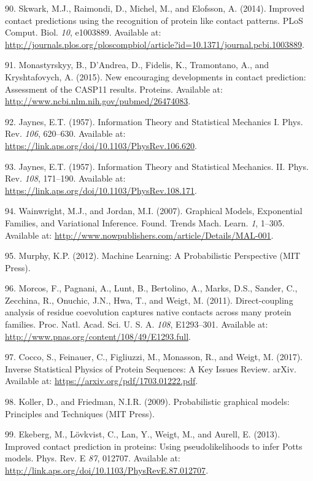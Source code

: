 \documentclass[11pt,a4paper,twoside]{book}
\theoremstyle{definition}
\theoremstyle{definition}
\theoremstyle{remark}
\begin{document}
\hypertarget{ref-Skwark2014a}{}
90. Skwark, M.J., Raimondi, D., Michel, M., and Elofsson, A. (2014).
Improved contact predictions using the recognition of protein like
contact patterns. PLoS Comput. Biol. \emph{10}, e1003889. Available at:
\url{http://journals.plos.org/ploscompbiol/article?id=10.1371/journal.pcbi.1003889}.

\hypertarget{ref-Monastyrskyy2015}{}
91. Monastyrskyy, B., D'Andrea, D., Fidelis, K., Tramontano, A., and
Kryshtafovych, A. (2015). New encouraging developments in contact
prediction: Assessment of the CASP11 results. Proteins. Available at:
\url{http://www.ncbi.nlm.nih.gov/pubmed/26474083}.

\hypertarget{ref-Jaynes1957a}{}
92. Jaynes, E.T. (1957). Information Theory and Statistical Mechanics I.
Phys. Rev. \emph{106}, 620--630. Available at:
\url{https://link.aps.org/doi/10.1103/PhysRev.106.620}.

\hypertarget{ref-Jaynes1957b}{}
93. Jaynes, E.T. (1957). Information Theory and Statistical Mechanics.
II. Phys. Rev. \emph{108}, 171--190. Available at:
\url{https://link.aps.org/doi/10.1103/PhysRev.108.171}.

\hypertarget{ref-Wainwright2007}{}
94. Wainwright, M.J., and Jordan, M.I. (2007). Graphical Models,
Exponential Families, and Variational Inference. Found. Trends Mach.
Learn. \emph{1}, 1--305. Available at:
\url{http://www.nowpublishers.com/article/Details/MAL-001}.

\hypertarget{ref-Murphy2012}{}
95. Murphy, K.P. (2012). Machine Learning: A Probabilistic Perspective
(MIT Press).

\hypertarget{ref-Morcos2011}{}
96. Morcos, F., Pagnani, A., Lunt, B., Bertolino, A., Marks, D.S.,
Sander, C., Zecchina, R., Onuchic, J.N., Hwa, T., and Weigt, M. (2011).
Direct-coupling analysis of residue coevolution captures native contacts
across many protein families. Proc. Natl. Acad. Sci. U. S. A.
\emph{108}, E1293--301. Available at:
\url{http://www.pnas.org/content/108/49/E1293.full}.

\hypertarget{ref-Cocco2017}{}
97. Cocco, S., Feinauer, C., Figliuzzi, M., Monasson, R., and Weigt, M.
(2017). Inverse Statistical Physics of Protein Sequences: A Key Issues
Review. arXiv. Available at: \url{https://arxiv.org/pdf/1703.01222.pdf}.

\hypertarget{ref-Koller2009}{}
98. Koller, D., and Friedman, N.I.R. (2009). Probabilistic graphical
models: Principles and Techniques (MIT Press).

\hypertarget{ref-Ekeberg2013}{}
99. Ekeberg, M., Lövkvist, C., Lan, Y., Weigt, M., and Aurell, E.
(2013). Improved contact prediction in proteins: Using pseudolikelihoods
to infer Potts models. Phys. Rev. E \emph{87}, 012707. Available at:
\url{http://link.aps.org/doi/10.1103/PhysRevE.87.012707}.
\end{document}
